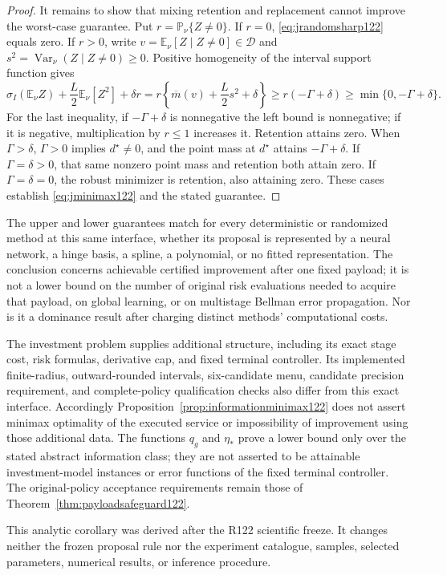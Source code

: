 \begin{proof}
It remains to show that mixing retention and replacement cannot improve
the worst-case guarantee. Put $r=\mathbb P_\nu\{Z\ne0\}$. If $r=0$,
\eqref{eq:jrandomsharp122} equals zero. If $r>0$, write
$v=\mathbb E_\nu[Z\mid Z\ne0]\in\mathcal D$ and
$s^2=\operatorname{Var}_\nu(Z\mid Z\ne0)\ge0$.
Positive homogeneity of the interval support function gives
\[
 \sigma_I(\mathbb E_\nu Z)
       +\frac L2\mathbb E_\nu[Z^2]+\delta r
 =r\left\{\overline m(v)+\frac L2s^2+\delta\right\}
 \ge r(-\Gamma+\delta)
 \ge \min\{0,-\Gamma+\delta\}.
\]
For the last inequality, if $-\Gamma+\delta$ is nonnegative the left
bound is nonnegative; if it is negative, multiplication by
$r\le1$ increases it. Retention attains zero. When $\Gamma>\delta$,
$\Gamma>0$ implies $d^\star\ne0$, and the point mass at $d^\star$
attains $-\Gamma+\delta$. If $\Gamma=\delta>0$, that same nonzero
point mass and retention both attain zero. If $\Gamma=\delta=0$,
the robust minimizer is retention, also attaining zero.
These cases establish \eqref{eq:jminimax122} and the stated guarantee.
\end{proof}

The upper and lower guarantees match for every deterministic or randomized
method at this same interface, whether its proposal is represented by a
neural network, a hinge basis, a spline, a polynomial, or no fitted
representation. The conclusion concerns achievable certified improvement
after one fixed payload; it is not a lower bound on the number of original
risk evaluations needed to acquire that payload, on global learning, or on
multistage Bellman error propagation. Nor is it a dominance result after
charging distinct methods' computational costs.

The investment problem supplies additional structure, including its exact
stage cost, risk formulas, derivative cap, and fixed terminal controller.
Its implemented finite-radius, outward-rounded intervals, six-candidate
menu, candidate precision requirement, and complete-policy qualification
checks also differ from this exact interface. Accordingly
Proposition~\ref{prop:informationminimax122} does not assert minimax
optimality of the executed service or impossibility of improvement using
those additional data. The functions $q_g$ and $\eta_*$ prove a lower bound
only over the stated abstract information class; they are not asserted to
be attainable investment-model instances or error functions of the fixed
terminal controller. The original-policy acceptance requirements remain
those of Theorem~\ref{thm:payloadsafeguard122}.

This analytic corollary was derived after the R122 scientific freeze.
It changes neither the frozen proposal rule nor the experiment catalogue,
samples, selected parameters, numerical results, or inference procedure.
